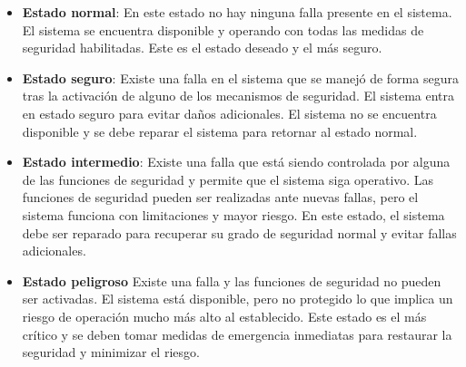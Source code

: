 \begin{itemize}
    \item \textbf{Estado normal}: En este estado no hay ninguna falla presente en el sistema. El sistema se encuentra disponible y operando con todas las medidas de seguridad habilitadas. Este es el estado deseado y el más seguro. 
    \item \textbf{Estado seguro}: Existe una falla en el sistema que se manejó de forma segura tras la activación de alguno de los mecanismos de seguridad. El sistema entra en estado seguro para evitar daños adicionales. El sistema no se encuentra disponible y se debe reparar el sistema para retornar al estado normal. 
    \item \textbf{Estado intermedio}: Existe una falla que está siendo controlada por alguna de las funciones de seguridad y permite que el sistema siga operativo. Las funciones de seguridad pueden ser realizadas ante nuevas fallas, pero el sistema funciona con limitaciones y mayor riesgo. En este estado, el sistema debe ser reparado para recuperar su grado de seguridad normal y evitar fallas adicionales. 
    \item \textbf{Estado peligroso} Existe una falla y las funciones de seguridad no pueden ser activadas. El sistema está disponible, pero no protegido lo que implica un riesgo de operación mucho más alto al establecido. Este estado es el más crítico y se deben tomar medidas de emergencia inmediatas para restaurar la seguridad y minimizar el riesgo.
    
\end{itemize}




